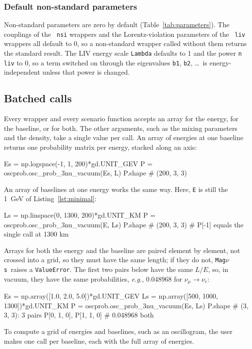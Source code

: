 \documentclass[final,5p,times,twocolumn,sort,compress]{elsarticle}
\makeatletter
\newcommand{\eg}{{\it e.g.}}
\DeclareRobustCommand{\_}{%
  \ifmmode\nfss@text{\textunderscore}\else\textunderscore\allowbreak\fi}
\newcommand{\Tab}{Table}
\newcommand{\tabl}[1]{\Tab~\ref{tab:#1}}
\newcommand{\magnus}{{\tt Mag}\ensuremath{\nu}{\tt s}}
\makeatother
\begin{document}

\subsubsection{Default non-standard parameters}

Non-standard parameters are zero by default (\tabl{parameters}). The couplings of the {\tt \_nsi} wrappers and the Lorentz-violation parameters of the {\tt \_liv} wrappers all default to 0, so a non-standard wrapper called without them returns the standard result. The LIV energy scale {\tt Lambda} defaults to 1 and the power {\tt n\_liv} to 0, so a term switched on through the eigenvalues {\tt b1}, {\tt b2}, \ldots\ is energy-independent unless that power is changed.


\subsection{Batched calls}
\label{sec:batched_calls}

Every wrapper and every scenario function accepts an array for the energy, for the baseline, or for both. The other arguments, such as the mixing parameters and the density, take a single value per call. An array of energies at one baseline returns one probability matrix per energy, stacked along an axis:
\begin{pysnip}
Es = np.logspace(-1, 1, 200)*gd.UNIT_GEV
P = oscprob.osc_prob_3nu_vacuum(Es, L)
P.shape                    # (200, 3, 3)
\end{pysnip}
An array of baselines at one energy works the same way. Here, {\tt E} is still the 1~GeV of Listing~\ref{lst:minimal}:
\begin{pysnip}
Ls = np.linspace(0, 1300, 200)*gd.UNIT_KM
P = oscprob.osc_prob_3nu_vacuum(E, Ls)
P.shape                    # (200, 3, 3)
# P[-1] equals the single call at 1300 km
\end{pysnip}
Arrays for both the energy and the baseline are paired element by element, not crossed into a grid, so they must have the same length; if they do not, \magnus\ raises a {\tt ValueError}. The first two pairs below have the same $L/E$, so, in vacuum, they have the same probabilities, \eg, 0.048968 for $\nu_\mu \to \nu_e$:
\begin{pysnip}
Es = np.array([1.0, 2.0, 5.0])*gd.UNIT_GEV
Ls = np.array([500, 1000, 1300])*gd.UNIT_KM
P = oscprob.osc_prob_3nu_vacuum(Es, Ls)
P.shape          # (3, 3, 3): 3 pairs
P[0, 1, 0], P[1, 1, 0]   # 0.048968 both
\end{pysnip}
To compute a grid of energies and baselines, such as an oscillogram, the user makes one call per baseline, each with the full array of energies.
\end{document}
